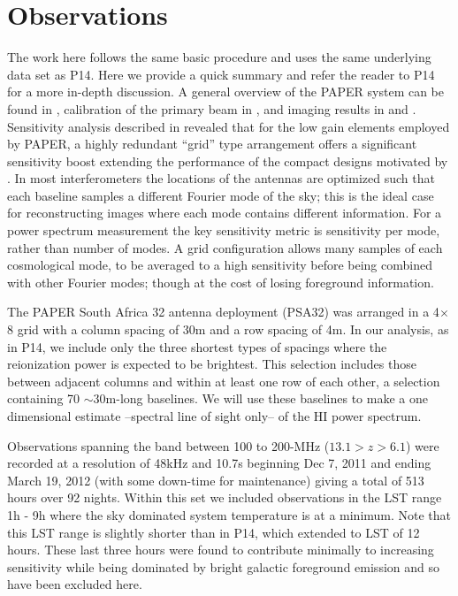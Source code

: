 \documentclass[preprint2]{aastex}
\begin{document}
\section{Observations}
\label{sec:observations}
The work here follows the same basic procedure and uses the same underlying data set as P14. Here we provide a quick summary and refer the reader to P14 for a more in-depth discussion.  A general overview of the PAPER system can be found in \cite{Parsons:2010p6757}, calibration of the primary beam in \cite{Pober:2012p8800}, and imaging results in \cite{Jacobs:2011p8438,jacobs:2013b} and \citet{Stefan:2013p9926}.  Sensitivity analysis described in \cite{Parsons:2012p9028} revealed that for the low gain elements employed by PAPER, a highly redundant ``grid'' type arrangement offers a significant sensitivity boost extending the performance of the compact designs motivated by \citet{Morales:2004p2494,Bowman:2006p1887,Lidz:2008p8251}.  In most interferometers the locations of the antennas are optimized such that each baseline samples a different Fourier mode of the sky; this is the ideal case for reconstructing images where each mode contains different information.  For a power spectrum measurement the key sensitivity metric is sensitivity per mode, rather than number of modes.  A grid configuration allows many samples of each cosmological mode, to be averaged to a high sensitivity before being combined with other Fourier modes; though at the cost of losing foreground information. 

The PAPER South Africa 32 antenna deployment (PSA32) was arranged in a 4$\times$8 grid with a column spacing of 30m and a row spacing of 4m.  In our analysis, as in P14, we include only the three shortest types of spacings where the reionization power is expected to be brightest. This selection includes those between adjacent columns and within at least one row of each other, a selection containing 70 $\sim$30m-long baselines.  We will use these baselines to make a one dimensional estimate --spectral line of sight only-- of the HI power spectrum.

Observations spanning the band between 100 to 200-MHz ($13.1>z>6.1$) were recorded at a resolution of 48kHz and 10.7s  beginning Dec 7, 2011 and ending March 19, 2012 (with some down-time for maintenance) giving a total of 513 hours over 92 nights.  Within this set we included observations in the LST range 1h - 9h where the sky dominated system temperature is at a minimum.  Note that this LST range is slightly shorter than in P14, which extended to LST of 12 hours. These last three hours were found to contribute minimally to increasing sensitivity while being dominated by bright galactic foreground emission and so have been excluded here.
\end{document}
